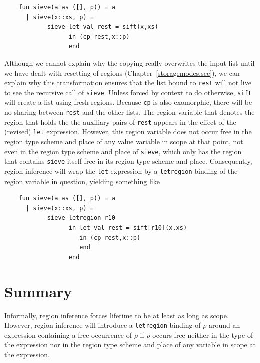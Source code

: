 \documentclass[12pt]{book}
\begin{document}
\begin{verbatim}
    fun sieve(a as ([], p)) = a
      | sieve(x::xs, p) = 
            sieve let val rest = sift(x,xs)
                  in (cp rest,x::p)
                  end
\end{verbatim}
Although we cannot explain why the copying really overwrites the input
list until we have dealt with resetting of regions (Chapter~\ref{storagemodes.sec}),
we can explain why this transformation ensures that the list bound to
{\tt rest} will not live to see the recursive call of {\tt sieve}.
Unless forced by context to do otherwise, {\tt sift} 
will create a list using fresh regions. Because {\tt cp} is also exomorphic,
there will be no sharing between {\tt rest} and the other lists. The region variable that denotes the region that holds the 
the auxiliary pairs of {\tt rest} appears in the effect of the
(revised) {\tt let} expression. However, this region variable does not occur free in the
region type scheme and place of any value variable in scope at that point, not
even in the region type scheme and place of {\tt sieve}, which only has the region that
contains {\tt sieve} itself free in its region type scheme and place. Consequently, region inference will wrap
the {\tt let} expression by a {\tt letregion} binding of the region
variable in question, yielding something like
\begin{verbatim}
    fun sieve(a as ([], p)) = a
      | sieve(x::xs, p) = 
            sieve letregion r10
                  in let val rest = sift[r10](x,xs)
                     in (cp rest,x::p)
                     end
                  end
\end{verbatim}
\section{Summary}
Informally, region inference forces lifetime to be at least as long as
scope. However, region inference will introduce a {\tt letregion}
binding of $\rho$ around an expression containing a free occurrence of
$\rho$ if $\rho$ occurs free neither in the type of the expression nor
in the region type scheme and place of any variable in scope at the
expression.
\end{document}
